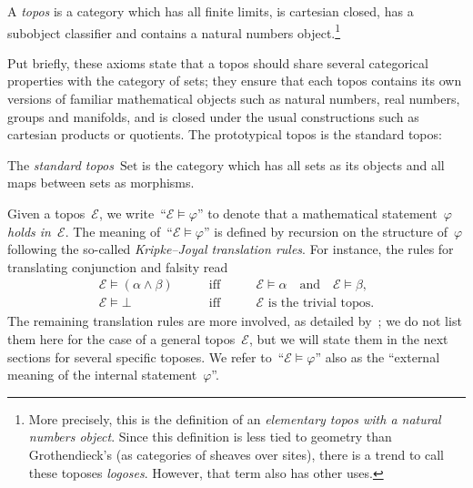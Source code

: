 \documentclass[graybox]{svmult}
\renewcommand{\E}{\mathcal{E}}
\newcommand{\Set}{\mathrm{Set}}
\renewcommand{\_}{\mathpunct{.}\,}
\newcommand{\?}{\,{:}\,}
\begin{document}
\begin{definition}A \emph{topos} is a category which has all finite
limits, is cartesian closed, has a subobject classifier and contains a natural
numbers object.\footnote{More precisely, this is the definition of an
\emph{elementary topos with a natural numbers object}. Since this definition is
less tied to geometry than Grothendieck's (as categories of sheaves over
sites), there is a trend to call these toposes \emph{logoses}. However, that
term also has other uses.}\end{definition}

Put briefly, these axioms state that a topos should share several categorical
properties with the category of sets; they ensure that each topos contains its
own versions of familiar mathematical objects such as natural numbers, real
numbers, groups and manifolds, and is closed under the usual constructions
such as cartesian products or quotients.
The prototypical topos is the standard topos:

\begin{definition}The \emph{standard topos}~$\Set$ is the category which has all
sets as its objects and all maps between sets as morphisms.\end{definition}

Given a topos~$\E$, we write~``$\E \models \varphi$'' to denote that a
mathematical statement~$\varphi$ \emph{holds in~$\E$}. The meaning of~``$\E \models
\varphi$'' is defined by recursion on the structure of~$\varphi$ following the
so-called \emph{Kripke--Joyal translation rules}. For instance, the rules for
translating conjunction and falsity read
\[ \begin{array}{lcl}
  \E \models (\alpha \wedge \beta) &\qquad\text{iff}\qquad&
  \E \models \alpha \quad\text{and}\quad \E \models \beta, \\[0.2em]
  \E \models \bot &\qquad\text{iff}\qquad&
  \text{$\E$ is the trivial topos}.
\end{array} \]
The remaining translation rules are more
involved, as detailed by~\cite[Section~VI.7]{moerdijk-maclane:sheaves-logic}; we do not list them here for
the case of a general topos~$\E$, but we will state them in the next sections
for several specific toposes. We refer to~``$\E \models \varphi$'' also as the
``external meaning of the internal statement~$\varphi$''.
\end{document}
